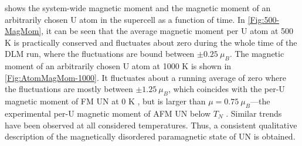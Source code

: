 \documentclass[preprint, 12pt]{elsarticle}
\newcommand{\?}{\stackrel{?}{=}}
\begin{document}
 shows the system-wide magnetic moment and the magnetic moment of an arbitrarily chosen U atom in the supercell as a function of time. In \cref{Fig:500-MagMom}, it can be seen that the average magnetic moment per U atom at 500 K is practically conserved and fluctuates about zero during the whole time of the DLM run, where the fluctuations are bound between $\pm 0.25 \ \mu_B$. The magnetic moment of an arbitrarily chosen U atom at 1000 K is shown in \cref{Fig:AtomMagMom-1000}. It fluctuates about a running average of zero where the fluctuations are mostly between $\pm 1.25 \ \mu_B$, which coincides with the per-U magnetic moment of FM UN at 0 K \cite{Kocevski2022I}, but is larger than $\mu = 0.75 \ \mu_B$---the experimental per-U magnetic moment of AFM UN below $T_N$ \cite{Curry1965}. Similar trends have been observed at all considered temperatures. Thus, a consistent qualitative description of the magnetically disordered paramagnetic state of UN is obtained.
\end{document}
